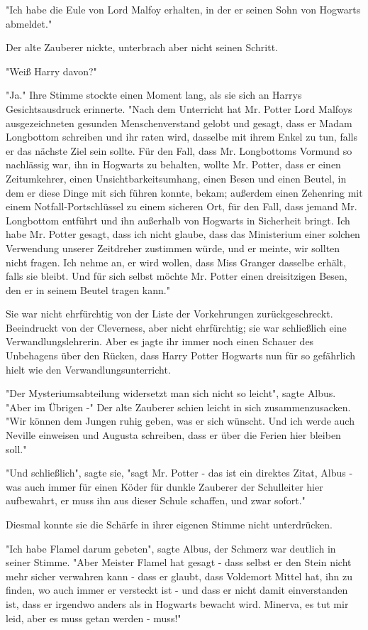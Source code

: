 {"Ich habe die Eule von Lord Malfoy erhalten, in der er seinen Sohn von Hogwarts abmeldet."

Der alte Zauberer nickte, unterbrach aber nicht seinen Schritt.

"Weiß Harry davon?"

"Ja." Ihre Stimme stockte einen Moment lang, als sie sich an Harrys Gesichtsausdruck erinnerte. "Nach dem Unterricht hat Mr. Potter Lord Malfoys ausgezeichneten gesunden Menschenverstand gelobt und gesagt, dass er Madam Longbottom schreiben und ihr raten wird, dasselbe mit ihrem Enkel zu tun, falls er das nächste Ziel sein sollte. Für den Fall, dass Mr. Longbottoms Vormund so nachlässig war, ihn in Hogwarts zu behalten, wollte Mr. Potter, dass er einen Zeitumkehrer, einen Unsichtbarkeitsumhang, einen Besen und einen Beutel, in dem er diese Dinge mit sich führen konnte, bekam; außerdem einen Zehenring mit einem Notfall-Portschlüssel zu einem sicheren Ort, für den Fall, dass jemand Mr. Longbottom entführt und ihn außerhalb von Hogwarts in Sicherheit bringt. Ich habe Mr. Potter gesagt, dass ich nicht glaube, dass das Ministerium einer solchen Verwendung unserer Zeitdreher zustimmen würde, und er meinte, wir sollten nicht fragen. Ich nehme an, er wird wollen, dass Miss Granger dasselbe erhält, falls sie bleibt. Und für sich selbst möchte Mr. Potter einen dreisitzigen Besen, den er in seinem Beutel tragen kann."

Sie war nicht ehrfürchtig von der Liste der Vorkehrungen zurückgeschreckt. Beeindruckt von der Cleverness, aber nicht ehrfürchtig; sie war schließlich eine Verwandlungslehrerin. Aber es jagte ihr immer noch einen Schauer des Unbehagens über den Rücken, dass Harry Potter Hogwarts nun für so gefährlich hielt wie den Verwandlungsunterricht.

"Der Mysteriumsabteilung widersetzt man sich nicht so leicht", sagte Albus. "Aber im Übrigen -" Der alte Zauberer schien leicht in sich zusammenzusacken. "Wir können dem Jungen ruhig geben, was er sich wünscht. Und ich werde auch Neville einweisen und Augusta schreiben, dass er über die Ferien hier bleiben soll."

"Und schließlich", sagte sie, "sagt Mr. Potter - das ist ein direktes Zitat, Albus - was auch immer für einen Köder für dunkle Zauberer der Schulleiter hier aufbewahrt, er muss ihn aus dieser Schule schaffen, und zwar sofort."

Diesmal konnte sie die Schärfe in ihrer eigenen Stimme nicht unterdrücken.

"Ich habe Flamel darum gebeten", sagte Albus, der Schmerz war deutlich in seiner Stimme. "Aber Meister Flamel hat gesagt - dass selbst er den Stein nicht mehr sicher verwahren kann - dass er glaubt, dass Voldemort Mittel hat, ihn zu finden, wo auch immer er versteckt ist - und dass er nicht damit einverstanden ist, dass er irgendwo anders als in Hogwarts bewacht wird. Minerva, es tut mir leid, aber es muss getan werden - muss!"

}

